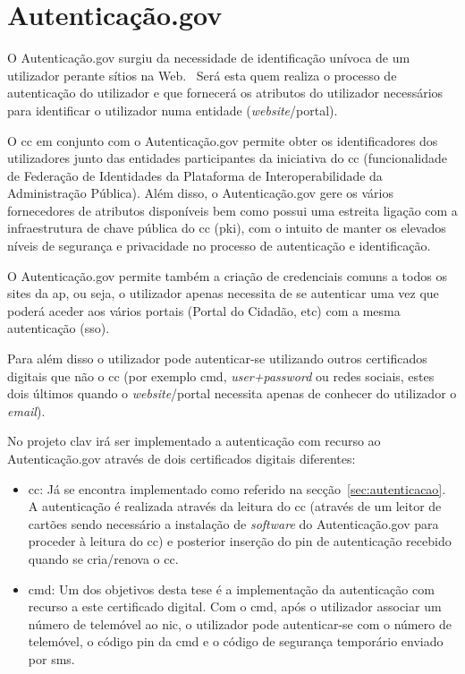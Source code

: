 \section{Autenticação.gov}
O Autenticação.gov surgiu da necessidade de identificação unívoca de um utilizador perante sítios na Web.~\cite{agov} Será esta quem realiza o processo de autenticação do utilizador e que fornecerá os atributos do utilizador necessários para identificar o utilizador numa entidade (\textit{website}/portal).

O \acrshort{cc} em conjunto com o Autenticação.gov permite obter os identificadores dos utilizadores junto das entidades participantes da iniciativa do \acrshort{cc} (funcionalidade de Federação de Identidades da Plataforma de Interoperabilidade da Administração Pública). Além disso, o Autenticação.gov gere os vários fornecedores de atributos disponíveis bem como possui uma estreita ligação com a infraestrutura de chave pública do \acrlong{cc} (\acrfull{pki}), com o intuito de manter os elevados níveis de segurança e privacidade no processo de autenticação e identificação.~\cite{agov}

O Autenticação.gov permite também a criação de credenciais comuns a todos os sites da \acrshort{ap}, ou seja, o utilizador apenas necessita de se autenticar uma vez que poderá aceder aos vários portais (Portal do Cidadão, etc) com a mesma autenticação (\acrshort{sso}).

Para além disso o utilizador pode autenticar-se utilizando outros certificados digitais que não o \acrshort{cc} (por exemplo \acrfull{cmd}, \textit{user+password} ou redes sociais, estes dois últimos quando o \textit{website}/portal necessita apenas de conhecer do utilizador o \textit{email}).

No projeto \acrshort{clav} irá ser implementado a autenticação com recurso ao Autenticação.gov através de dois certificados digitais diferentes:
\begin{itemize}
    \item \acrfull{cc}: Já se encontra implementado como referido na secção~\ref{sec:autenticacao}. A autenticação é realizada através da leitura do \acrshort{cc} (através de um leitor de cartões sendo necessário a instalação de \textit{software} do Autenticação.gov para proceder à leitura do \acrshort{cc}) e posterior inserção do \acrshort{pin} de autenticação recebido quando se cria/renova o \acrshort{cc}.
    \item \acrfull{cmd}: Um dos objetivos desta tese é a implementação da autenticação com recurso a este certificado digital. Com o \acrshort{cmd}, após o utilizador associar um número de telemóvel ao \acrshort{nic}, o utilizador pode autenticar-se com o número de telemóvel, o código \acrshort{pin} da \acrshort{cmd} e o código de segurança temporário enviado por \acrshort{sms}.
\end{itemize}

